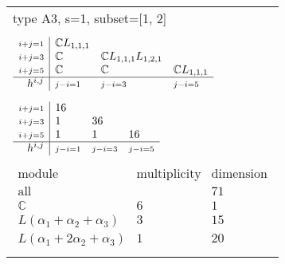 \documentclass[crop,border=2mm]{standalone}
\begin{document}
\begin{tabular}{l}
{\huge type A3, s=1, subset=[1, 2]}\\ \\


$\displaystyle
\begin{array}{r|l l l}
	{\scriptstyle i+j=1}&\mathbb{C}L_{1,1,1}&&\\
	{\scriptstyle i+j=3}&\mathbb{C}&\mathbb{C}L_{1,1,1}L_{1,2,1}&\\
	{\scriptstyle i+j=5}&\mathbb{C}&\mathbb{C}&\mathbb{C}L_{1,1,1}\\
	\hline h^{i,j}&{\scriptstyle j-i=1}&{\scriptstyle j-i=3}&{\scriptstyle j-i=5}
\end{array}
$ \\ \\


$\displaystyle
\begin{array}{r|l l l}
	{\scriptstyle i+j=1}&16&&\\
	{\scriptstyle i+j=3}&1&36&\\
	{\scriptstyle i+j=5}&1&1&16\\
	\hline h^{i,j}&{\scriptstyle j-i=1}&{\scriptstyle j-i=3}&{\scriptstyle j-i=5}
\end{array}
$ \\ \\


$\displaystyle
\begin{array}{rll}
	\text{module}&\text{multiplicity}&\text{dimension} \\ \hline \text{all}&&71 \\
	\mathbb{C}&6&1\\
	L\left(\alpha_{1}+\alpha_{2}+\alpha_{3}\right)&3&15\\
	L\left(\alpha_{1}+ 2\alpha_{2}+\alpha_{3}\right)&1&20
\end{array}
$ \\ \\

\end{tabular}
\end{document}
